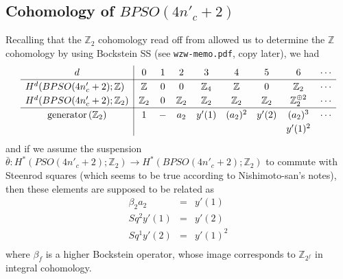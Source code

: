 \documentclass[12pt]{article}
\numberwithin{equation}{section}
\def\bZ{\mathbb{Z}}
\begin{document}
\subsection{Cohomology of $BPSO(4n'_c+2)$}
Recalling that the $\bZ_2$ cohomology read off from \cite{KonoMimura1974}
allowed us to determine the $\bZ$ cohomology by using Bockstein SS
(see \texttt{wzw-memo.pdf}, copy later), we had
\begin{equation}
	\renewcommand{\arraystretch}{1.2}
	\begin{array}{c|cccccccccccccccc}
		d & 0 & 1 & 2 & 3 & 4 & 5 & 6 & \cdots \\
		\hline
		\multicolumn{1}{l|}{H^d(BPSO(4n'_c+2);\bZ)} & \bZ & 0 & 0 & \bZ_4 & \bZ & 0 & \bZ_2 & \cdots\\
		\multicolumn{1}{l|}{H^d(BPSO(4n'_c+2);\bZ_2)} & \bZ_2 & 0 & \bZ_2 & \bZ_2 & \bZ_2 & \bZ_2 & \bZ_2^{\oplus 2} & \cdots\\
		\hline
		\text{generator} \,(\bZ_2) & 1 & - & a_2 & y'(1) & (a_2)^2 & y'(2) & (a_2)^3 & \cdots\\
		&&&&&&& y'(1)^2\\
	\end{array}
\end{equation}
and if we assume the suspension $\bar\theta: H^\ast(PSO(4n'_c+2);\bZ_2) \to H^\ast(BPSO(4n'_c+2);\bZ_2)$
to commute with Steenrod squares (which seems to be true according to Nishimoto-san's notes),
then these elements are supposed to be related as
\begin{equation*}
	\begin{array}{ccl}
		\beta_2 a_2 & = & y'(1)\\
		Sq^2 y'(1) & = & y'(2)\\
		Sq^1 y'(2) & = & y'(1)^2\\
	\end{array}
\end{equation*}
where $\beta_f$ is a higher Bockstein operator, whose image corresponds to $\bZ_{2^f}$ in integral cohomology.
\end{document}
